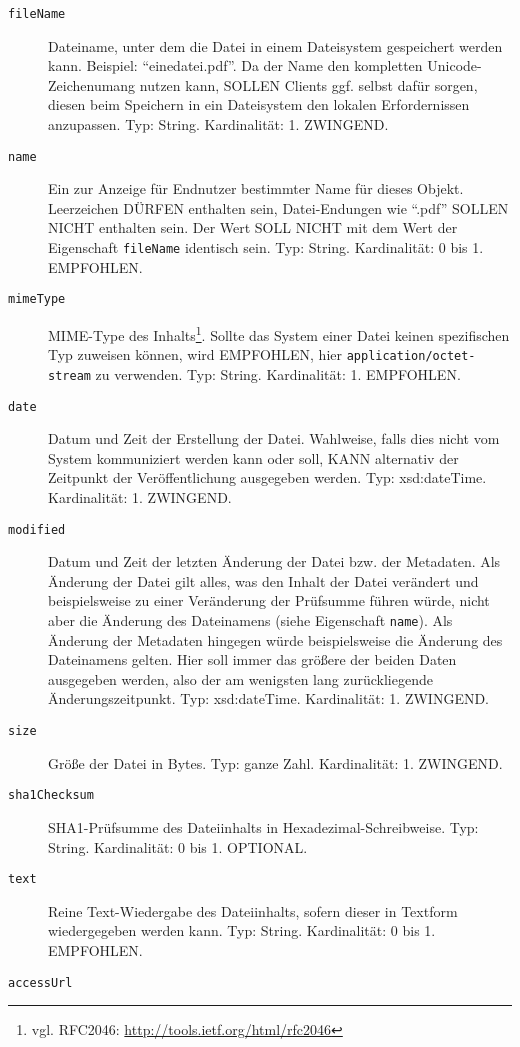 \documentclass[,a4paper]{article}
\begin{document}
\begin{description}
\item[\texttt{fileName}]
Dateiname, unter dem die Datei in einem Dateisystem gespeichert werden
kann. Beispiel: ``einedatei.pdf''. Da der Name den kompletten
Unicode-Zeichenumang nutzen kann, SOLLEN Clients ggf. selbst dafür
sorgen, diesen beim Speichern in ein Dateisystem den lokalen
Erfordernissen anzupassen. Typ: String. Kardinalität: 1. ZWINGEND.
\item[\texttt{name}]
Ein zur Anzeige für Endnutzer bestimmter Name für dieses Objekt.
Leerzeichen DÜRFEN enthalten sein, Datei-Endungen wie ``.pdf'' SOLLEN
NICHT enthalten sein. Der Wert SOLL NICHT mit dem Wert der Eigenschaft
\texttt{fileName} identisch sein. Typ: String. Kardinalität: 0 bis 1.
EMPFOHLEN.
\item[\texttt{mimeType}]
MIME-Type des Inhalts\footnote{vgl. RFC2046:
  \url{http://tools.ietf.org/html/rfc2046}}. Sollte das System einer
Datei keinen spezifischen Typ zuweisen können, wird EMPFOHLEN, hier
\texttt{application/octet-stream} zu verwenden. Typ: String.
Kardinalität: 1. EMPFOHLEN.
\item[\texttt{date}]
Datum und Zeit der Erstellung der Datei. Wahlweise, falls dies nicht vom
System kommuniziert werden kann oder soll, KANN alternativ der Zeitpunkt
der Veröffentlichung ausgegeben werden. Typ: xsd:dateTime. Kardinalität:
1. ZWINGEND.
\item[\texttt{modified}]
Datum und Zeit der letzten Änderung der Datei bzw. der Metadaten. Als
Änderung der Datei gilt alles, was den Inhalt der Datei verändert und
beispielsweise zu einer Veränderung der Prüfsumme führen würde, nicht
aber die Änderung des Dateinamens (siehe Eigenschaft \texttt{name}). Als
Änderung der Metadaten hingegen würde beispielsweise die Änderung des
Dateinamens gelten. Hier soll immer das größere der beiden Daten
ausgegeben werden, also der am wenigsten lang zurückliegende
Änderungszeitpunkt. Typ: xsd:dateTime. Kardinalität: 1. ZWINGEND.
\item[\texttt{size}]
Größe der Datei in Bytes. Typ: ganze Zahl. Kardinalität: 1. ZWINGEND.
\item[\texttt{sha1Checksum}]
SHA1-Prüfsumme des Dateiinhalts in Hexadezimal-Schreibweise. Typ:
String. Kardinalität: 0 bis 1. OPTIONAL.
\item[\texttt{text}]
Reine Text-Wiedergabe des Dateiinhalts, sofern dieser in Textform
wiedergegeben werden kann. Typ: String. Kardinalität: 0 bis 1.
EMPFOHLEN.
\item[\texttt{accessUrl}]

\end{description}
\end{document}
